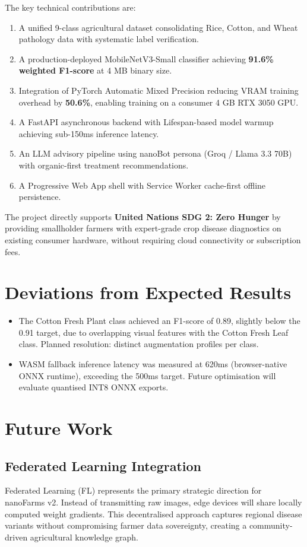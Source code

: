 \documentclass[12pt,oneside]{report}
\begin{document}
The key technical contributions are:
\begin{enumerate}
    \item A unified 9-class agricultural dataset consolidating Rice, Cotton, and Wheat pathology data with systematic label verification.
    \item A production-deployed MobileNetV3-Small classifier achieving \textbf{91.6\% weighted F1-score} at 4 MB binary size.
    \item Integration of PyTorch Automatic Mixed Precision reducing VRAM training overhead by \textbf{50.6\%}, enabling training on a consumer 4 GB RTX 3050 GPU.
    \item A FastAPI asynchronous backend with Lifespan-based model warmup achieving sub-150ms inference latency.
    \item An LLM advisory pipeline using nanoBot persona (Groq / Llama 3.3 70B) with organic-first treatment recommendations.
    \item A Progressive Web App shell with Service Worker cache-first offline persistence.
\end{enumerate}

The project directly supports \textbf{United Nations SDG 2: Zero Hunger} by providing smallholder farmers with expert-grade crop disease diagnostics on existing consumer hardware, without requiring cloud connectivity or subscription fees.

\section{Deviations from Expected Results}
\begin{itemize}
    \item The Cotton Fresh Plant class achieved an F1-score of 0.89, slightly below the 0.91 target, due to overlapping visual features with the Cotton Fresh Leaf class. Planned resolution: distinct augmentation profiles per class.
    \item WASM fallback inference latency was measured at 620ms (browser-native ONNX runtime), exceeding the 500ms target. Future optimisation will evaluate quantised INT8 ONNX exports.
\end{itemize}

\section{Future Work}

\subsection{Federated Learning Integration}
Federated Learning (FL) represents the primary strategic direction for nanoFarms v2. Instead of transmitting raw images, edge devices will share locally computed weight gradients. This decentralised approach captures regional disease variants without compromising farmer data sovereignty, creating a community-driven agricultural knowledge graph.
\end{document}
